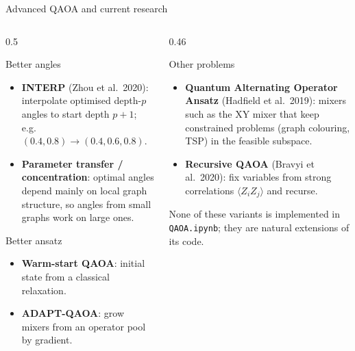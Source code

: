\documentclass[aspectratio=169,11pt]{beamer}
\newcommand{\key}[1]{{\color{qdark}\textbf{#1}}}
\begin{document}
\begin{frame}{Advanced QAOA and current research}
  \footnotesize
  \begin{columns}[T]
    \begin{column}{0.5\textwidth}
      \begin{block}{Better angles}
        \begin{itemize}
          \item \key{INTERP} (Zhou et al.\ 2020): interpolate optimised depth-$p$ angles to start depth $p+1$; e.g.\ $(0.4, 0.8) \to (0.4, 0.6, 0.8)$.
          \item \key{Parameter transfer / concentration}: optimal angles depend mainly on local graph structure, so angles from small graphs work on large ones.
        \end{itemize}
      \end{block}
      \begin{block}{Better ansatz}
        \begin{itemize}
          \item \key{Warm-start QAOA}: initial state from a classical relaxation.
          \item \key{ADAPT-QAOA}: grow mixers from an operator pool by gradient.
        \end{itemize}
      \end{block}
    \end{column}
    \begin{column}{0.46\textwidth}
      \begin{block}{Other problems}
        \begin{itemize}
          \item \key{Quantum Alternating Operator Ansatz} (Hadfield et al.\ 2019): mixers such as the XY mixer that keep constrained
            problems (graph colouring, TSP) in the feasible subspace.
          \item \key{Recursive QAOA} (Bravyi et al.\ 2020): fix variables from strong correlations $\langle Z_iZ_j\rangle$ and recurse.
        \end{itemize}
      \end{block}
      \small None of these variants is implemented in \texttt{QAOA.ipynb}; they are natural extensions of its code.
    \end{column}
  \end{columns}
\end{frame}
\end{document}
